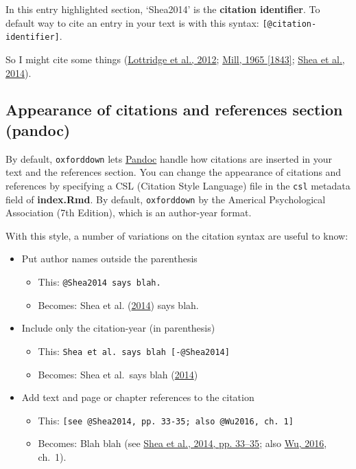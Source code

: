 \documentclass[a4paper, nobind]{templates/ociamthesis}
\providecommand{\tightlist}{%
  \setlength{\itemsep}{0pt}\setlength{\parskip}{0pt}}
\begin{document}
In this entry highlighted section, `Shea2014' is the \textbf{citation identifier}.
To default way to cite an entry in your text is with this syntax: \texttt{{[}@citation-identifier{]}}.

So I might cite some things (\protect\hyperlink{ref-Lottridge2012}{Lottridge et al., 2012}; \protect\hyperlink{ref-Mill1965}{Mill, 1965 {[}1843{]}}; \protect\hyperlink{ref-Shea2014}{Shea et al., 2014}).

\hypertarget{citation-appearance}{%
\subsection{Appearance of citations and references section (pandoc)}\label{citation-appearance}}

By default, \texttt{oxforddown} lets \href{https://pandoc.org}{Pandoc} handle how citations are inserted in your text and the references section.
You can change the appearance of citations and references by specifying a CSL (Citation Style Language) file in the \texttt{csl} metadata field of \textbf{index.Rmd}.
By default, \texttt{oxforddown} by the Americal Psychological Association (7th Edition), which is an author-year format.

With this style, a number of variations on the citation syntax are useful to know:

\begin{itemize}
\tightlist
\item
  Put author names outside the parenthesis

  \begin{itemize}
  \tightlist
  \item
    This: \texttt{@Shea2014\ says\ blah.}
  \item
    Becomes: Shea et al. (\protect\hyperlink{ref-Shea2014}{2014}) says blah.
  \end{itemize}
\item
  Include only the citation-year (in parenthesis)

  \begin{itemize}
  \tightlist
  \item
    This: \texttt{Shea\ et\ al.\ says\ blah\ {[}-@Shea2014{]}}
  \item
    Becomes: Shea et al.~says blah (\protect\hyperlink{ref-Shea2014}{2014})
  \end{itemize}
\item
  Add text and page or chapter references to the citation

  \begin{itemize}
  \tightlist
  \item
    This: \texttt{{[}see\ @Shea2014,\ pp.\ 33-35;\ also\ @Wu2016,\ ch.\ 1{]}}
  \item
    Becomes: Blah blah (see \protect\hyperlink{ref-Shea2014}{Shea et al., 2014, pp. 33--35}; also \protect\hyperlink{ref-Wu2016}{Wu, 2016}, ch.~1).
  \end{itemize}
\end{itemize}
\end{document}
